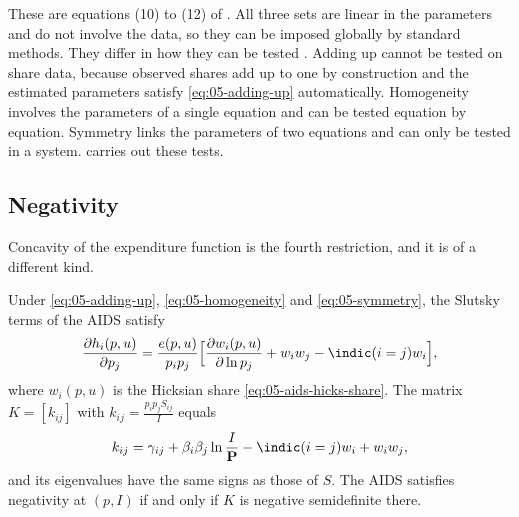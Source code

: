 These are equations (10) to (12) of \citet[p.~314]{DeatonMuellbauer1980a}. All three sets are linear in the
parameters and do not involve the data, so they can be imposed globally by standard methods. They differ in
how they can be tested \citep[p.~316]{DeatonMuellbauer1980a}. Adding up cannot be tested on share data,
because observed shares add up to one by construction and the estimated parameters satisfy
\eqref{eq:05-adding-up} automatically. Homogeneity involves the parameters of a single equation and can be
tested equation by equation. Symmetry links the parameters of two equations and can only be tested in a
system.  carries out these tests.

\subsection{Negativity}\label{sec:05-negativity}

Concavity of the expenditure function is the fourth restriction, and it is of a different kind.

\begin{proposition}\label{prop:05-negativity}
Under \eqref{eq:05-adding-up}, \eqref{eq:05-homogeneity} and \eqref{eq:05-symmetry}, the Slutsky terms of the
AIDS satisfy
\begin{equation}\label{eq:05-hicks-deriv}
\frac{\partial h_i(p, u)}{\partial p_j} = \frac{e(p, u)}{p_ip_j}\Big[\frac{\partial w_i(p,u)}{\partial\ln p_j}
+ w_iw_j - \indic(i=j)w_i\Big],
\end{equation}
where $w_i(p, u)$ is the Hicksian share \eqref{eq:05-aids-hicks-share}. The matrix $K = [k_{ij}]$ with
$k_{ij} = \frac{p_ip_jS_{ij}}{I}$ equals
\begin{equation}\label{eq:05-K}
k_{ij} = \gamma_{ij} + \beta_i\beta_j\ln\frac{I}{\mathbf{P}} - \indic(i=j)w_i + w_iw_j ,
\end{equation}
and its eigenvalues have the same signs as those of $S$. The AIDS satisfies negativity at $(p, I)$ if and
only if $K$ is negative semidefinite there.
\end{proposition}

